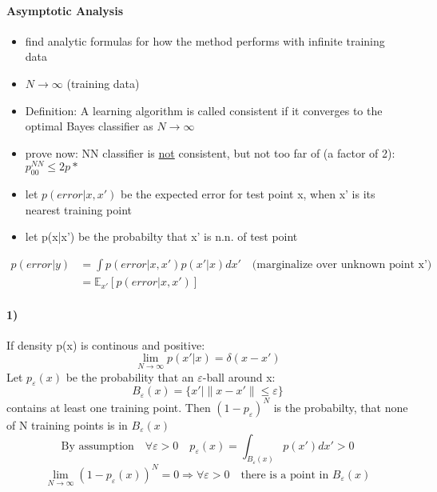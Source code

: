 \documentclass[11pt]{article}
\begin{document}
        \paragraph{Asymptotic Analysis}
          \begin{itemize}
            \item find analytic formulas for how the method performs with
            infinite training data
            \item $N \rightarrow \infty$ (training data)
            \item Definition: A learning algorithm is called consistent if
            it converges to the optimal Bayes classifier as
            $N \rightarrow \infty$
            \item prove now: NN classifier is \underline{not} consistent, but
            not too far of (a factor of 2): $p_{00}^{NN} \leq 2p*$
            \item let $p(error|x, x')$ be the expected error for test point
            x, when x' is its nearest training point
            \item let p(x|x') be the probabilty that x' is n.n. of test point
          \end{itemize}
          \begin{equation*}
            \begin{align}
              p(error|y) &= \int p(error|x, x')p(x'|x)dx' \quad \text{(marginalize over
              unknown point x')} \\
              &= \mathbb{E}_{x'}[p(error|x, x')]
            \end{align}
          \end{equation*}
        \paragraph{1)}
          If density p(x) is continous and positive:
          \begin{equation*}
            \lim_{N \to \infty} p(x'|x) = \delta(x-x')
          \end{equation*}
          Let $p_{\varepsilon}(x)$ be the probability that an $\varepsilon$-ball around x:
          \begin{equation*}
            B_{\varepsilon}(x) = \{ x'| \lVert x-x' \rVert \leq \varepsilon \}
          \end{equation*}
          contains at least one training point. Then $(1-p_{\varepsilon})^N$
          is the probabilty, that none of N training points is in $B_{\varepsilon}(x)$
          \begin{equation*}
            \text{By assumption} \quad \forall \varepsilon > 0 \quad p_{\varepsilon}(x)
            = \int_{B_{\varepsilon}(x)} p(x') dx' > 0
          \end{equation*}
          \begin{equation*}
            \lim_{N \to \infty} (1-p_{\varepsilon}(x))^N = 0 \Rightarrow
            \forall \varepsilon > 0 \quad \text{there is a point in $B_{\varepsilon}(x)$}
          \end{equation*}
\end{document}
